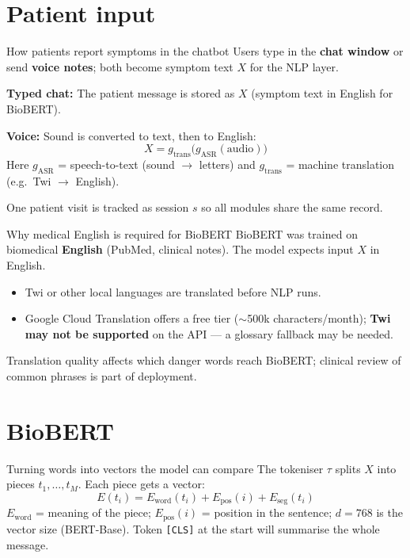 \documentclass[aspectratio=169,11pt]{beamer}
\begin{document}
\section{Patient input}

\begin{frame}{How patients report symptoms in the chatbot}
	Users type in the \textbf{chat window} or send \textbf{voice notes}; both become symptom text $X$ for the NLP layer.

	\vspace{0.25em}
	\textbf{Typed chat:} The patient message is stored as $X$ (symptom text in English for BioBERT).

	\textbf{Voice:} Sound is converted to text, then to English:
	\[
	X = g_{\text{trans}}\!\bigl(g_{\text{ASR}}(\mathrm{audio})\bigr)
	\]
	Here $g_{\text{ASR}}$ = speech-to-text (sound $\rightarrow$ letters) and $g_{\text{trans}}$ = machine translation (e.g.\ Twi $\rightarrow$ English).

	\vspace{0.25em}
	\footnotesize One patient visit is tracked as session $s$ so all modules share the same record.
\end{frame}

\begin{frame}{Why medical English is required for BioBERT}
	BioBERT was trained on biomedical \textbf{English} (PubMed, clinical notes). The model expects input $X$ in English.

	\vspace{0.3em}
	\begin{itemize}
		\item Twi or other local languages are translated before NLP runs.
		\item Google Cloud Translation offers a free tier ($\sim$500k characters/month); \textbf{Twi may not be supported} on the API --- a glossary fallback may be needed.
	\end{itemize}

	\vspace{0.25em}
	\footnotesize Translation quality affects which danger words reach BioBERT; clinical review of common phrases is part of deployment.
\end{frame}

\section{BioBERT}

\begin{frame}{Turning words into vectors the model can compare}
	The tokeniser $\tau$ splits $X$ into pieces $t_1,\ldots,t_M$. Each piece gets a vector:
	\[
	E(t_i) = E_{\text{word}}(t_i) + E_{\text{pos}}(i) + E_{\text{seg}}(t_i)
	\]
	$E_{\text{word}}$ = meaning of the piece; $E_{\text{pos}}(i)$ = position in the sentence; $d=768$ is the vector size (BERT-Base). Token \texttt{[CLS]} at the start will summarise the whole message.
\end{frame}
\end{document}
